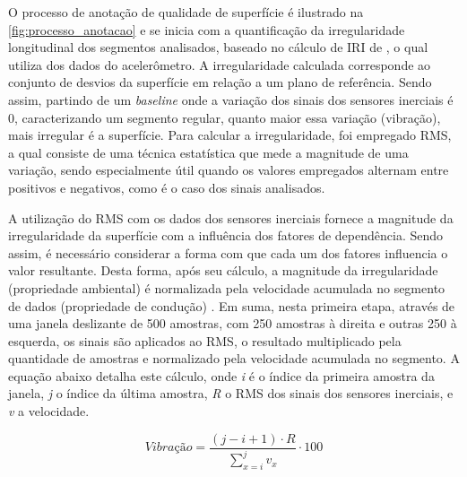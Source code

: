 O processo de anotação de qualidade de superfície é ilustrado na \autoref{fig:processo_anotacao} e se inicia com a quantificação da irregularidade longitudinal dos segmentos analisados, baseado no cálculo de IRI de , o qual utiliza dos dados do acelerômetro. A irregularidade calculada corresponde ao conjunto de desvios da superfície em relação a um plano de referência. Sendo assim, partindo de um \textit{baseline} onde a variação dos sinais dos sensores inerciais é 0, caracterizando um segmento regular, quanto maior essa variação (vibração), mais irregular é a superfície. Para calcular a irregularidade, foi empregado RMS, a qual consiste de uma técnica estatística que mede a magnitude de uma variação, sendo especialmente útil quando os valores empregados alternam entre positivos e negativos, como é o caso dos sinais analisados. 

A utilização do RMS com os dados dos sensores inerciais fornece a magnitude da irregularidade da superfície com a influência dos fatores de dependência. Sendo assim, é necessário considerar a forma com que cada um dos fatores influencia o valor resultante. Desta forma, após seu cálculo, a magnitude da irregularidade (propriedade ambiental) é normalizada pela velocidade acumulada no segmento de dados (propriedade de condução) \cite{Li2018}. Em suma, nesta primeira etapa, através de uma janela deslizante de 500 amostras, com 250 amostras à direita e outras 250 à esquerda, os sinais são aplicados ao RMS, o resultado multiplicado pela quantidade de amostras e normalizado pela velocidade acumulada no segmento. A equação abaixo detalha este cálculo, onde \emph{i} é o índice da primeira amostra da janela, \emph{j} o índice da última amostra, \emph{R} o RMS dos sinais dos sensores inerciais, e \emph{v} a velocidade.

\begin{equation}
  \textit{Vibração} = \frac{(j - i + 1) \cdot R}{\sum_{x=i}^{j} v_x} \cdot 100
\end{equation}

